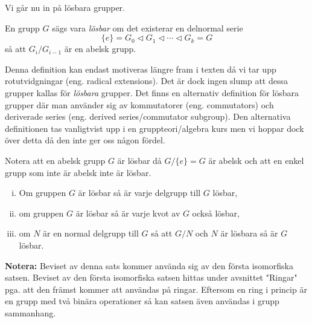 \documentclass{article}
\theoremstyle{definition}
\begin{document}
Vi går nu in på lösbara grupper. 
\begin{mydef}{}{}
  En grupp $G$ sägs vara \textit{lösbar} om det existerar en delnormal serie 
  \[ \{e\} = G_0 \triangleleft G_1 \triangleleft \cdots \triangleleft G_k = G \]
  så att $G_i/G_{i-1}$ är en abelsk grupp.
\end{mydef}

Denna definition kan endast motiveras längre fram i texten då vi tar upp rotutvidgningar (eng. radical extensions). 
Det är dock ingen slump att dessa grupper kallas för \textit{lösbara} grupper. Det finns en alternativ definition 
för lösbara grupper där man använder sig av kommutatorer (eng. commutators) och deriverade series (eng. derived series/commutator subgroup). 
Den alternativa definitionen tas vanligtvist upp i en gruppteori/algebra kurs men vi hoppar dock över detta då den inte ger oss någon fördel.

Notera att en abelsk grupp $G$ är lösbar
då $G/\{e\} = G$ är abelsk och att en enkel grupp som inte är abelsk inte är lösbar.  

\hypertarget{sats3.2.2}{}
\begin{mytheo}{}{}
  \begin{enumerate}[(i)]
    \item Om gruppen $G$ är lösbar så är varje delgrupp till $G$ lösbar,
    \item om gruppen $G$ är lösbar så är varje kvot av $G$ också lösbar, 
    \item om $N$ är en normal delgrupp till $G$ så att $G/N$ och $N$ är lösbara så är $G$ lösbar.
  \end{enumerate}
\end{mytheo}

\textbf{Notera:} Beviset av denna sats kommer använda sig av den första isomorfiska satsen. Beviset av den första isomorfiska satsen 
hittas under avsnittet "Ringar" pga. att den främst kommer att användas på ringar. Eftersom en ring i princip är en grupp med två binära operationer 
så kan satsen även användas i grupp sammanhang. 
\end{document}
